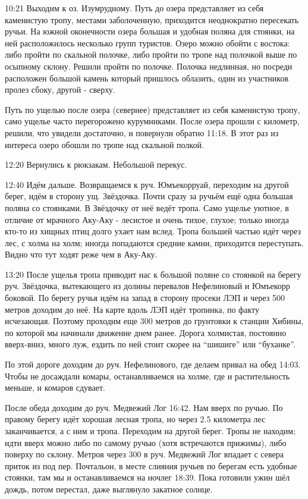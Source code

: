 10:21 Выходим к оз. Изумрудному. Путь до озера представляет из себя каменистую тропу, местами заболоченную,
приходится неоднократно пересекать ручьи. На южной оконечности озера большая и удобная поляна для стоянки,
на ней расположилось несколько групп туристов. Озеро можно обойти с востока: либо пройти по скальной полочке,
либо пройти по тропе над полочкой выше по осыпному склону. Решили пройти по полочке.
Полочка недлинная, но посреди расположен большой камень который пришлось облазить, один из участников пролез сбоку,
другой - сверху.

Путь по ущелью после озера (севернее) представляет из себя каменистую тропу, само ущелье часто перегорожено курумниками.
После озера прошли с километр, решили, что увидели достаточно, и повернули обратно 11:18.
В этот раз из интереса озеро обошли по тропе над скальной полкой.

12:20 Вернулись к рюкзакам. Небольшой перекус.

12:40 Идём дальше. Возвращаемся к руч. Юмъекорруай, переходим на другой берег, идём в сторону ущ. Звёздочка.
Почти сразу за ручьём ещё одна большая поляна со стоянками. В Звёздочку от неё ведёт тропа.
Само ущелье уютное, в отличие от мрачного Аку-Аку - лесистое и очень тихое, глухое;
только иногда кто-то из хищных птиц долго ухает нам вслед. Тропа большей частью идёт через лес, с холма на холм;
иногда попадаются средние камни, приходится переступать. Видно что тут ходят реже чем в Аку-Аку.

13:20 После ущелья тропа приводит нас к большой поляне со стоянкой на берегу руч.
Звёздочка, вытекающего из долины перевалов Нефелиновый и Юмъекорр боковой.
По берегу ручья идём на запад в сторону просеки ЛЭП и через 500 метров доходим до неё.
На карте вдоль ЛЭП идёт тропинка, по факту исчезающая. Поэтому проходим еще 300 метров до грунтовки к станции Хибины,
по которой мы начинали движение днем ранее. Дорога холмистая, постоянно вверх-вниз, много луж,
ездить по ней стоит скорее на ``шишиге'' или ``буханке''.

По этой дороге доходим до руч. Нефелинового, где делаем привал на обед 14:03. Чтобы не досаждали комары,
останавливаемся на холме, где и растительность меньше, и комаров сдувает.

После обеда доходим до руч. Медвежий Лог 16:42. Нам вверх по ручью. По правому берегу идёт хорошая лесная тропа,
но через 2.5 километра лес заканчивается, а с ним и тропа. Переходим на другой берег. Тропы не находим;
идти вверх можно либо по самому ручью (хотя встречаются прижимы), либо поверху по склону. Метров через
300 в руч. Медвежий Лог впадает с севера приток из под пер. Почтальон, в месте слияния ручьев по берегам
есть удобные стоянки, там мы и останавливаемся на ночлег 18:39.
Пока готовили ужин шёл дождь, потом перестал, даже выглянуло закатное солнце.

